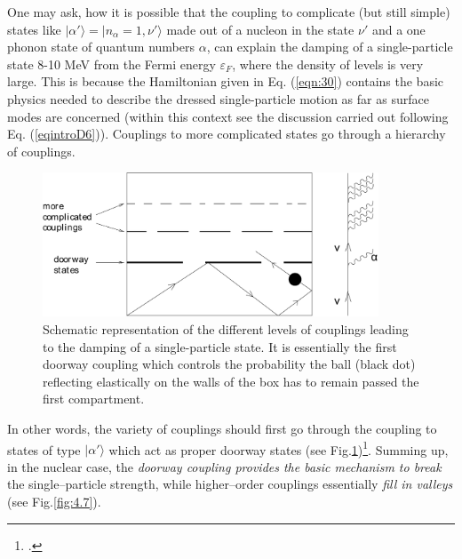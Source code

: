 One may ask, how it is possible that the coupling to complicate (but still simple) states like $|\alpha'\rangle = |n_\alpha = 1,\nu'\rangle$ made out of a nucleon in the state $\nu'$ and a one phonon state of quantum numbers $\alpha$, can explain the  damping of a single-particle state 8-10 MeV from the Fermi energy $\varepsilon_F$, where the density of levels  is very large. This is because the Hamiltonian given in Eq. (\ref{eqn:30}) contains  the basic physics needed to describe the dressed single-particle motion as far as surface modes are concerned (within this context see the discussion carried out following Eq. (\ref{eqintroD6})). Couplings to more complicated states  go through a hierarchy of couplings.
\begin{figure}[h!]
\centerline {
\includegraphics*[width=10cm]{introduccion/figs/figintroD6}
}
\caption{Schematic representation of the different levels of couplings leading to the damping of a single-particle state. It is essentially the first doorway coupling which controls the probability the ball (black dot) reflecting elastically on the walls of the box has to remain passed the first compartment.}
\label{fig:4.6}
\end{figure}
In other words, the variety of couplings  should first go  through the coupling to states of type $|\alpha'\rangle$ which act as proper doorway states (see Fig.\ref{fig:4.6})\footnote{\cite{Feshbach:58}.}. Summing up, in  the nuclear case, the {\it doorway coupling provides the basic mechanism to break}  the single--particle strength, while higher--order couplings essentially  {\it fill in valleys} (see Fig.\ref{fig:4.7}).

